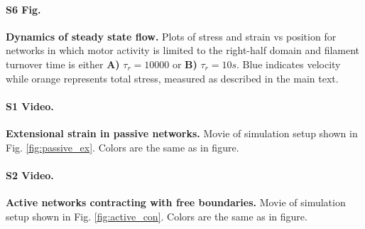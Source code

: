 \paragraph*{S6 Fig.}
\label{fig:combo_prof}
{\bf  Dynamics of steady state flow.}  Plots of stress and strain vs position for networks in which motor activity is limited to the right-half domain and filament turnover time is either  \textbf{A)} $\tau_r = 10000$ or  \textbf{B)} $\tau_r = 10 s$.  Blue indicates velocity while orange represents total stress, measured as described in the main text. 


\paragraph*{S1 Video.}
\label{passive_ex_video}
{\bf Extensional strain in passive networks.}  Movie of simulation setup shown in Fig. \ref{fig:passive_ex}.  Colors are the same as in figure.

\paragraph*{S2 Video.}
\label{active_con_video}
{\bf Active networks contracting with free boundaries.}  Movie of simulation setup shown in Fig. \ref{fig:active_con}.  Colors are the same as in figure.
